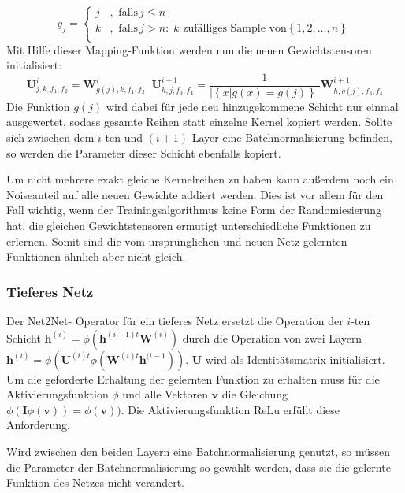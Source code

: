 \begin{equation}
 g_{j} =  
 \begin{cases}
 j & , \text{ falls} \, j \leq n \\
 k & , \text{ falls} \, j>n : \;  k \text{ zufälliges Sample von} \left\{ 1,2,\ldots, n \right\} \\ 
 \end{cases} 
 \end{equation}
 Mit Hilfe dieser Mapping-Funktion werden nun die neuen Gewichtstensoren initialisiert:
 \begin{equation}
 \mathbf{U}^i_{j,k,f_1,f_2} = \mathbf{W}^i_{g(j),k,f_1,f_2} \; \; \mathbf{U}^{i+1}_{h,j,f_3,f_4}= \frac{1}{|\left\{ x | g(x)=g(j)\right\}|}\mathbf{W}^{i+1}_{h,g(j),f_3,f_4}
 \end{equation}
Die Funktion $g(j)$ wird dabei für jede neu hinzugekommene Schicht nur einmal ausgewertet, sodass gesamte Reihen statt einzelne Kernel kopiert werden. Sollte sich zwischen dem $i$-ten und $(i+1)$-Layer eine Batchnormalisierung befinden, so werden die Parameter dieser Schicht ebenfalls kopiert.

Um nicht mehrere exakt gleiche Kernelreihen zu haben kann außerdem noch ein Noiseanteil auf alle neuen Gewichte addiert werden. Dies ist vor allem für den Fall wichtig, wenn der Trainingsalgorithmus keine Form der Randomiesierung hat, die gleichen Gewichtstensoren ermutigt unterschiedliche Funktionen zu erlernen. Somit sind die vom ursprünglichen und neuen Netz gelernten Funktionen ähnlich aber nicht gleich.

\subsubsection{Tieferes Netz}

Der Net2Net- Operator für ein tieferes Netz ersetzt die Operation der $i$-ten Schicht $\mathbf{h}^{(i)} = \phi\left(\mathbf{h}^{(i-1)t} \mathbf{W}^{(i)}\right)$ durch die Operation von zwei Layern  $\mathbf{h}^{(i)} = \phi( \mathbf{U}^{(i)t} \phi(\mathbf{W}^{(i)t}  \mathbf{h}^{(i-1}) )$. $\mathbf{U}$ wird als Identitätsmatrix initialisiert. Um die geforderte Erhaltung der gelernten Funktion zu erhalten muss für die Aktivierungsfunktion $\phi$ und alle Vektoren $\mathbf{v}$ die Gleichung $\phi(\mathbf{I} \phi(\mathbf{v}))=\phi(\mathbf{v}))$. Die Aktivierungsfunktion ReLu erfüllt diese Anforderung.

Wird zwischen den beiden Layern eine Batchnormalisierung genutzt, so müssen die Parameter der Batchnormalisierung so gewählt werden, dass sie die gelernte Funktion des Netzes nicht verändert.



